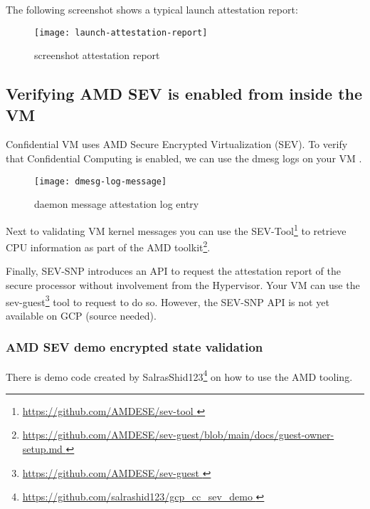 The following screenshot shows a typical launch attestation report:

\begin{figure}[!ht]
    \centering
    \texttt{[image: launch-attestation-report]}
    \caption{screenshot attestation report}
    \label{fig:launch-attestation-report}
\end{figure}


\subsection*{Verifying AMD SEV is enabled from inside the VM }
Confidential VM uses AMD Secure Encrypted Virtualization (SEV). 
To verify that Confidential Computing is enabled, 
we can use the dmesg logs on your VM 
\citep{marsden_using_2019}. 

\begin{figure}[!ht]
    \centering
    \texttt{[image: dmesg-log-message]}
    \caption{daemon message attestation log entry}
    \label{fig:dmesg-log-message}
\end{figure}

Next to validating VM kernel messages you can use the 
SEV-Tool\footnote{\url{https://github.com/AMDESE/sev-tool  }} 
to retrieve CPU information as part of the 
AMD toolkit\footnote{\url{https://github.com/AMDESE/sev-guest/blob/main/docs/guest-owner-setup.md }}.

Finally, 
SEV-SNP introduces an API to request the attestation report 
of the secure processor without involvement from the Hypervisor. 
Your VM can use the sev-guest\footnote{\url{https://github.com/AMDESE/sev-guest }} 
tool to request to do so. 
However, the SEV-SNP API is not yet available on GCP (source needed).

\subsubsection*{AMD SEV demo encrypted state validation}
There is demo code created by SalrasShid123\footnote{\url{https://github.com/salrashid123/gcp_cc_sev_demo }} on how to use the AMD tooling. 